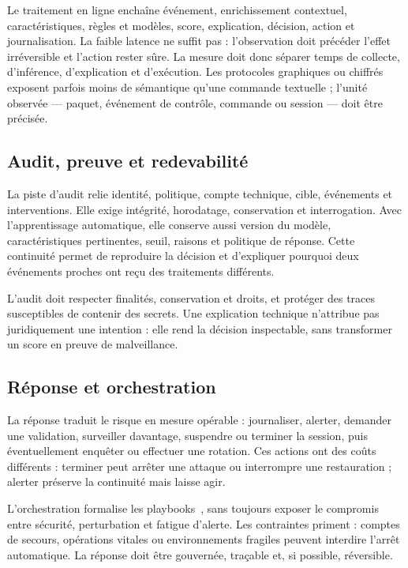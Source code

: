 \documentclass[11pt,a4paper,oneside]{report}
\theoremstyle{definition}
\theoremstyle{plain}
\begin{document}
Le traitement en ligne enchaîne événement, enrichissement contextuel, caractéristiques, règles et modèles, score, explication, décision, action et journalisation. La faible latence ne suffit pas : l'observation doit précéder l'effet irréversible et l'action rester sûre. La mesure doit donc séparer temps de collecte, d'inférence, d'explication et d'exécution. Les protocoles graphiques ou chiffrés exposent parfois moins de sémantique qu'une commande textuelle ; l'unité observée --- paquet, événement de contrôle, commande ou session --- doit être précisée.

\subsection{Audit, preuve et redevabilité}

La piste d'audit relie identité, politique, compte technique, cible, événements et interventions. Elle exige intégrité, horodatage, conservation et interrogation. Avec l'apprentissage automatique, elle conserve aussi version du modèle, caractéristiques pertinentes, seuil, raisons et politique de réponse. Cette continuité permet de reproduire la décision et d'expliquer pourquoi deux événements proches ont reçu des traitements différents.

L'audit doit respecter finalités, conservation et droits, et protéger des traces susceptibles de contenir des secrets. Une explication technique n'attribue pas juridiquement une intention : elle rend la décision inspectable, sans transformer un score en preuve de malveillance.

\subsection{Réponse et orchestration}

La réponse traduit le risque en mesure opérable : journaliser, alerter, demander une validation, surveiller davantage, suspendre ou terminer la session, puis éventuellement enquêter ou effectuer une rotation. Ces actions ont des coûts différents : terminer peut arrêter une attaque ou interrompre une restauration ; alerter préserve la continuité mais laisse agir.

L'orchestration formalise les playbooks~\cite{ref15,ref41}, sans toujours exposer le compromis entre sécurité, perturbation et fatigue d'alerte. Les contraintes priment : comptes de secours, opérations vitales ou environnements fragiles peuvent interdire l'arrêt automatique. La réponse doit être gouvernée, traçable et, si possible, réversible.
\end{document}
